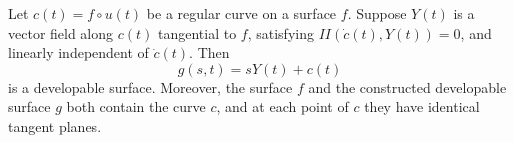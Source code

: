 Let $c(t) = f \circ u(t)$ be a regular curve on a surface $f$. Suppose $Y(t)$ is a vector field along $c(t)$ tangential to $f$, satisfying $II(\dot{c}(t), Y(t)) = 0$, and linearly independent of $\dot{c}(t)$. Then
$$g(s, t) = sY(t) + c(t)$$
is a developable surface. Moreover, the surface $f$ and the constructed developable surface $g$ both contain the curve $c$, and at each point of $c$ they have identical tangent planes.
